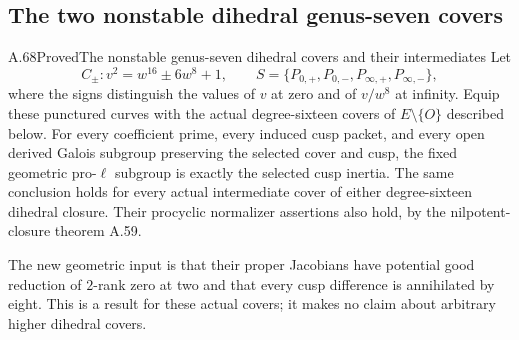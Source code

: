 \subsection{The two nonstable dihedral genus-seven covers}

\begin{statement}{A.68}{Proved}{The nonstable genus-seven dihedral covers and their intermediates}
Let
\[
 C_{\pm}:v^2=w^{16}\pm6w^8+1,
 \qquad S=\{P_{0,+},P_{0,-},P_{\infty,+},P_{\infty,-}\},
\]
where the signs distinguish the values of \(v\) at zero and of
\(v/w^8\) at infinity. Equip these punctured curves with the actual
degree-sixteen covers of \(E\setminus\{O\}\) described below.
For every coefficient prime, every induced cusp packet, and every
open derived Galois subgroup preserving the selected cover and cusp,
the fixed geometric pro-\(\ell\) subgroup is exactly the selected
cusp inertia. The same conclusion holds for every actual intermediate
cover of either degree-sixteen dihedral closure. Their procyclic normalizer assertions also hold, by
the nilpotent-closure theorem A.59.

The new geometric input is that their proper Jacobians have potential
good reduction of \(2\)-rank zero at two and that every cusp difference
is annihilated by eight. This is a result for these actual covers;
it makes no claim about arbitrary higher dihedral covers.
\end{statement}

